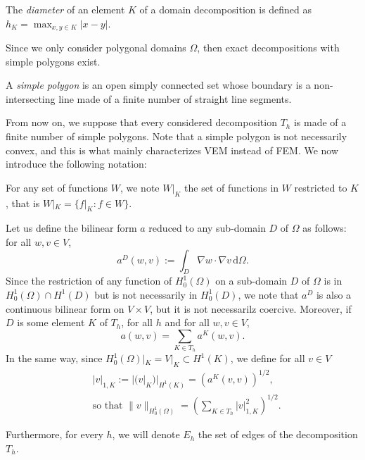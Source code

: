 \begin{definition}[Diameter]
The \textit{diameter} of an element $K$ of a domain decomposition is defined as $h_K = \max_{x,y\in K}|x-y|$. 
\end{definition}

\noindent Since we only consider polygonal domains $\Omega$, then exact decompositions with simple polygons exist. 

\begin{definition}
A \textit{simple polygon} is an open simply connected set whose boundary is a non-intersecting line made of a finite number of straight line segments. 
\end{definition}

\noindent From now on, we suppose that every considered decomposition $T_h$ is made of a finite number of simple polygons. Note that a simple polygon is not necessarily convex, and this is what mainly characterizes VEM instead of FEM. We now introduce the following notation: 
\begin{notation}
For any set of functions $W$, we note $W|_K$ the set of functions in $W$ restricted to $K$, that is $W|_K = \{f|_K : f\in W\}$. 
\end{notation}

\noindent Let us define the bilinear form $a$ reduced to any sub-domain $D$ of $\Omega$ as follows: for all $w,v\in V$,
$$ a^D(w,v) := \int_D \nabla w \cdot \nabla v \, \mathrm{d}\Omega. $$
Since the restriction of any function of $H_0^1(\Omega)$ on a sub-domain $D$ of $\Omega$ is in $H_0^1(\Omega) \cap H^1(D)$ but is not necessarily in $H_0^1(D)$, we note that $a^D$ is also a continuous bilinear form on $V\times V$, but it is not necessarilz coercive. Moreover, if $D$ is some element $K$ of $T_h$, for all $h$ and for all $w,v\in V$, \begin{equation}\label{aKvsa}
a(w,v) = \sum_{K\in T_h} a^K(w,v).\end{equation}
In the same way, since $H_0^1(\Omega)|_K = V|_K \subset H^1(K)$, we define for all $v\in V$
\begin{align}
&|v|_{1, K} := |(v|_K)|_{H^1(K)} = \left( a^K\left( v,v \right)\right)^{1/2}, \label{def1Knorm}\\
&\text{so that } \|v\|_{H_0^1(\Omega)} = \left(\sum_{K\in T_h} |v|_{1,K}^2\right)^{1/2}.\label{H01normsplit}
\end{align} 

\noindent Furthermore, for every $h$, we will denote $E_h$ the set of edges of the decomposition $T_h$.

